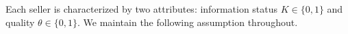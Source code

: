 Each seller is characterized by two attributes: information status $K \in \{0,1\}$ and quality $\theta \in \{0,1\}$. We maintain the following assumption throughout.
